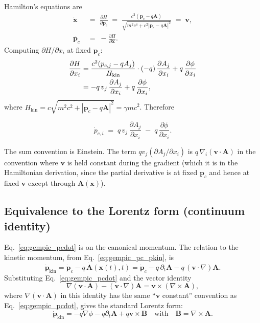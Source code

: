 \documentclass[11pt,a4paper]{article}
\newcommand{\vv}[1]{\mathbf{#1}}
\begin{document}
Hamilton's equations are
\begin{align}
\dot{\vv{x}} &\;=\; \frac{\partial H}{\partial \vv{p}_c}
              \;=\; \frac{c^2 (\vv{p}_c - q\vv{A})}{
                       \sqrt{m^2 c^4 + c^2|\vv{p}_c - q\vv{A}|^2}}
              \;=\; \vv{v},
              \label{eq:gempic_xdot}\\
\dot{\vv{p}_c} &\;=\; -\frac{\partial H}{\partial \vv{x}}.
              \label{eq:gempic_pcdot_abs}
\end{align}
Computing $\partial H/\partial x_i$ at fixed $\vv{p}_c$:
\begin{align}
\frac{\partial H}{\partial x_i}
  &= \frac{c^2 (p_{c,j} - qA_j)}{H_{\mathrm{kin}}} \cdot
     (-q)\,\frac{\partial A_j}{\partial x_i}
     + q\,\frac{\partial \phi}{\partial x_i}\notag\\
  &= -q\, v_j \, \frac{\partial A_j}{\partial x_i}
     + q\,\frac{\partial \phi}{\partial x_i},
\end{align}
where $H_{\mathrm{kin}} = c\sqrt{m^2 c^2 + |\vv{p}_c - q\vv{A}|^2}
                       = \gamma m c^2$.  Therefore
\begin{eqbox}
\begin{equation}
\label{eq:gempic_pcdot}
\dot{p}_{c,i} \;=\; q\, v_j \, \frac{\partial A_j}{\partial x_i}
                  \;-\; q\,\frac{\partial \phi}{\partial x_i}.
\end{equation}
\end{eqbox}
The sum convention is Einstein.  The term $q v_j (\partial A_j/\partial x_i)$
is $q\,\nabla_i(\vv{v}\cdot\vv{A})$ in the convention where $\vv{v}$
is held constant during the gradient (which it is in the Hamiltonian
derivation, since the partial derivative is at fixed $\vv{p}_c$ and
hence at fixed $\vv{v}$ except through $\vv{A}(\vv{x})$).

\subsection{Equivalence to the Lorentz form (continuum identity)}

Eq.~\eqref{eq:gempic_pcdot} is on the canonical momentum.  The
relation to the kinetic momentum, from
Eq.~\eqref{eq:gempic_pc_pkin}, is
\begin{equation}
\dot{\vv{p}}_{\mathrm{kin}}
   = \dot{\vv{p}}_c - q\,\dot{\vv{A}}(\vv{x}(t),t)
   = \dot{\vv{p}}_c - q\,\partial_t\vv{A}
                   - q\,(\vv{v}\cdot\nabla)\vv{A}.
\end{equation}
Substituting Eq.~\eqref{eq:gempic_pcdot} and the vector identity
\begin{equation}
\label{eq:vec_id}
\nabla(\vv{v}\cdot\vv{A}) - (\vv{v}\cdot\nabla)\vv{A}
   = \vv{v}\times(\nabla\times\vv{A}),
\end{equation}
where $\nabla(\vv{v}\cdot\vv{A})$ in this identity has the same
``$\vv{v}$ constant'' convention as
Eq.~\eqref{eq:gempic_pcdot}, gives the standard Lorentz form:
\begin{equation}
\dot{\vv{p}}_{\mathrm{kin}}
   = -q\nabla\phi - q\partial_t\vv{A} + q\vv{v}\times\vv{B}
   \quad\text{with}\quad
   \vv{B} = \nabla\times\vv{A}.
\end{equation}
\end{document}
